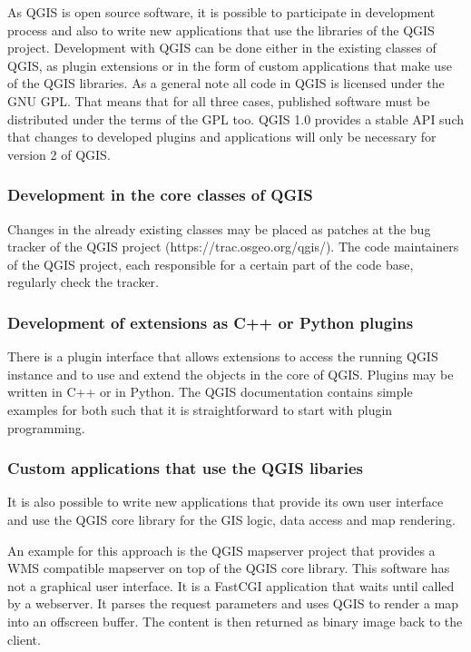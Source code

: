 
As QGIS is open source software, it is possible to participate in development process and also to write new applications that use the libraries of the QGIS project. Development with QGIS can be done either in the existing classes of QGIS, as plugin extensions or in the form of custom applications that make use of the QGIS libraries. As a general note all code in QGIS is licensed under the GNU GPL. That means that for all three cases, published software must be distributed under the terms of the GPL too. QGIS 1.0 provides a stable API such that changes to developed plugins and applications will only be necessary for version 2 of QGIS.

\subsubsection{Development in the core classes of QGIS}
Changes in the already existing classes may be placed as patches at the bug tracker of the QGIS project (https://trac.osgeo.org/qgis/). The code maintainers of the QGIS project, each responsible for a certain part of the code base, regularly check the tracker.

\subsubsection{Development of extensions as C++ or Python plugins}
There is a plugin interface that allows extensions to access the running QGIS instance and to use and extend the objects in the core of QGIS. Plugins may be written in C++ or in Python. The QGIS documentation contains simple examples for both such that it is straightforward to start with plugin programming.

\subsubsection{Custom applications that use the QGIS libaries}
It is also possible to write new applications that provide its own user interface and use the QGIS core library for the GIS logic, data access and map rendering. 

An example for this approach is the QGIS mapserver project that provides a WMS compatible mapserver on top of the QGIS core library. This software has not a graphical user interface. It is a FastCGI application that waits until called by a webserver. It parses the request parameters and uses QGIS to render a map into an offscreen buffer. The content is then returned as binary image back to the client.

